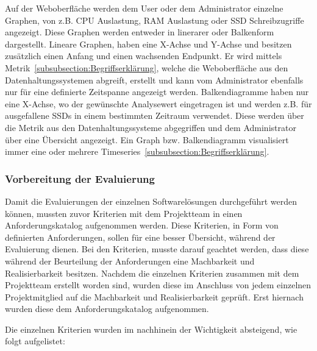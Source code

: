 Auf der Weboberfläche werden dem User oder dem Administrator einzelne Graphen,
von z.B. CPU Auslastung, RAM Auslastung oder SSD Schreibzugriffe angezeigt.
Diese Graphen werden entweder in linerarer oder Balkenform dargestellt.
Lineare Graphen, haben eine X-Achse und Y-Achse und besitzen
zusätzlich einen Anfang und einen wachsenden Endpunkt. Er wird mittels
Metrik~\ref{subsubsection:Begriffserklärung}, welche die Weboberfläche aus den
Datenhaltungssystemen abgreift, erstellt und kann vom Administrator ebenfalls
nur für eine definierte Zeitspanne angezeigt werden. Balkendiagramme haben nur
eine X-Achse, wo der gewünschte Analysewert eingetragen ist und werden z.B. für
ausgefallene SSDs in einem bestimmten Zeitraum verwendet. Diese werden über die
Metrik aus den Datenhaltungssysteme abgegriffen und dem Administrator über eine
Übersicht angezeigt. Ein Graph bzw. Balkendiagramm visualisiert immer eine
oder mehrere Timeseries~\ref{subsubsection:Begriffserklärung}.

\subsubsection{Vorbereitung der Evaluierung}
\label{subsubsec:vorbereiten_der_evaluierung_frontend}
Damit die Evaluierungen der einzelnen Softwarelösungen durchgeführt werden
können, mussten zuvor Kriterien mit dem Projektteam in einen Anforderungskatalog
aufgenommen werden. Diese Kriterien, in Form von definierten Anforderungen,
sollen für eine besser Übersicht, während der Evaluierung dienen. Bei den
Kriterien, musste darauf geachtet werden, dass diese während der Beurteilung
der Anforderungen eine Machbarkeit und Realisierbarkeit besitzen. Nachdem die
einzelnen Kriterien zusammen mit dem Projektteam erstellt worden sind, wurden
diese im Anschluss von jedem einzelnen Projektmitglied auf die Machbarkeit und
Realisierbarkeit geprüft. Erst hiernach wurden diese dem Anforderungskatalog
aufgenommen.

Die einzelnen Kriterien wurden im nachhinein der Wichtigkeit absteigend,
wie folgt aufgelistet:


